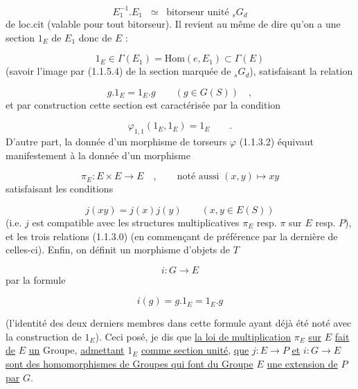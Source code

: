 \begin{equation*}
E_1^{-1}.E_1 \;\; \simeq \;\; \text{bitorseur unité } {}_sG_d
\end{equation*}
de loc.cit (valable pour tout bitorseur). Il revient au même de dire qu'on a une section $1_E$ de $E_1$ donc de $E$ :

\begin{equation}\tag{1.1.5.5}
1_E \in \Gamma(E_1) = \mathrm{Hom}(e,E_1) \subset \Gamma(E)
\end{equation}
(savoir l'image par (1.1.5.4) de la section marquée de ${}_sG_d$), satisfaisant la relation

\begin{equation*}
g.1_E = 1_E.g \qquad (g \in G(S)) \quad ,
\end{equation*}
et par construction cette section est caractérisée par la condition

\begin{equation}\tag{1.1.5.6}
\varphi_{1,1}(1_E,1_E) = 1_E \qquad .
\end{equation}
D'autre part, la donnée d'un morphisme de torseurs $\varphi$ (1.1.3.2) équivaut manifestement à la donnée d'un morphisme

\begin{equation}\tag{1.1.5.7}
\pi_E : E\times E \longrightarrow E \quad , \qquad \text{noté aussi } (x,y) \longmapsto xy
\end{equation}
satisfaisant les conditions

\begin{equation}\tag{1.1.5.8}
j(xy) = j(x)j(y) \qquad (x,y \in E(S))
\end{equation}
(i.e. $j$ est compatible avec les structures multiplicatives $\pi_E$ resp. $\pi$ sur $E$ resp. $P$), et les trois relations (1.1.3.0) (en commençant de préférence par la dernière de celles-ci). Enfin, on définit un morphisme d'objets de \underline{$T$}

\begin{equation*}
i : G \longrightarrow E
\end{equation*}
par la formule

\begin{equation}\tag{1.1.5.9}
i(g) = g.1_E = 1_E.g 
\end{equation}


 (l'identité des deux derniers membres dans cette formule ayant déjà été noté avec la construction de $1_E$). Ceci posé, je dis que \underline{la loi de multiplication} $\pi_E$ \underline{sur} $E$ \underline{fait de} $E$ \underline{un} Groupe, \underline{admettant} $1_E$ \underline{comme section unité}, \underline{que} $j : E \rightarrow P$ \underline{et} $i : G \rightarrow E$ \underline{sont des homomorphismes de Groupes qui font du Groupe} $E$ \underline{une extension de} $P$ \underline{par} $G$.

